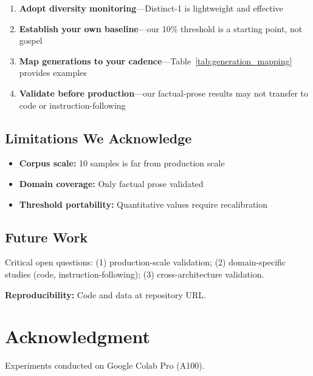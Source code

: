 \documentclass[conference]{IEEEtran}
\begin{document}
\begin{enumerate}
    \item \textbf{Adopt diversity monitoring}---Distinct-1 is lightweight and effective
    \item \textbf{Establish your own baseline}---our 10\% threshold is a starting point, not gospel
    \item \textbf{Map generations to your cadence}---Table~\ref{tab:generation_mapping} provides examples
    \item \textbf{Validate before production}---our factual-prose results may not transfer to code or instruction-following
\end{enumerate}

\subsection{Limitations We Acknowledge}

\begin{itemize}
    \item \textbf{Corpus scale:} 10 samples is far from production scale
    \item \textbf{Domain coverage:} Only factual prose validated
    \item \textbf{Threshold portability:} Quantitative values require recalibration
\end{itemize}

\subsection{Future Work}

Critical open questions: (1) production-scale validation; (2) domain-specific studies (code, instruction-following); (3) cross-architecture validation.

\textbf{Reproducibility:} Code and data at repository URL.

\section*{Acknowledgment}

Experiments conducted on Google Colab Pro (A100).
\end{document}
